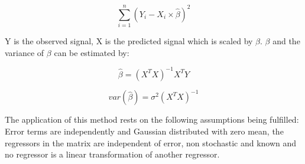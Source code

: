 \begin{equation}
\sum_{i=1}^{n}(Y_i-X_i\times\hat{\beta})^2
\end{equation}  

Y is the observed signal, X is the predicted signal which is scaled by $\beta$. $\beta$ and the variance of $\beta$ can be estimated by: 

\begin{equation}
\hat{\beta}=(X^TX)^{-1}X^TY
\end{equation}

\begin{equation}
var(\hat{\beta})=\sigma^2(X^TX)^{-1}
\end{equation}

The application of this method rests on the following assumptions being fulfilled: Error terms are independently and Gaussian distributed with zero mean, the regressors in the matrix are independent of error, non stochastic and known and no regressor is a linear transformation of another regressor. \cite{Monti2011}    




